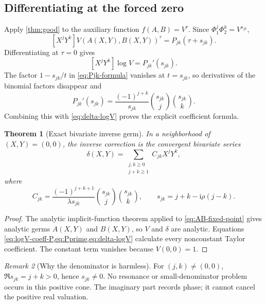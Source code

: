 \documentclass[11pt,oneside]{article}
\numberwithin{equation}{section}
\theoremstyle{plain}
\newtheorem{theorem}{Theorem}[section]
\theoremstyle{definition}
\theoremstyle{remark}
\newtheorem{remark}[theorem]{Remark}
\newcommand{\ii}{\mathrm i}
\begin{document}
\subsection{Differentiating at the forced zero}

Apply \cref{thm:good} to the auxiliary function \(f(A,B)=V^\tau\).  Since
\(\Phi_1^j\Phi_2^k=V^{s_{jk}}\),
\begin{equation}\label{eq:Vtau-coeff}
 [X^jY^k]V(A(X,Y),B(X,Y))^\tau
 =P_{jk}(\tau+s_{jk}).
\end{equation}
Differentiating at \(\tau=0\) gives
\begin{equation}\label{eq:logV-coeff-P}
 [X^jY^k]\log V=P_{jk}'(s_{jk}).
\end{equation}
The factor \(1-s_{jk}/t\) in \cref{eq:Pjk-formula} vanishes at
\(t=s_{jk}\), so derivatives of the binomial factors disappear and
\begin{equation}\label{eq:Pprime}
 P_{jk}'(s_{jk})=
 \frac{(-1)^{j+k}}{s_{jk}}
 \binom{s_{jk}}j\binom{s_{jk}}k.
\end{equation}
Combining this with \cref{eq:delta-logV} proves the explicit coefficient
formula.

\begin{theorem}[Exact bivariate inverse germ]\label{thm:bivariate-inverse}
In a neighborhood of \((X,Y)=(0,0)\), the inverse correction is the
convergent bivariate series
\begin{equation}\label{eq:delta-XY}
 \delta(X,Y)=
 \sum_{\substack{j,k\ge0\\j+k\ge1}}
 C_{jk}X^jY^k,
\end{equation}
where
\begin{equation}\label{eq:Cjk}
 C_{jk}=\frac{(-1)^{j+k+1}}{\lambda s_{jk}}
 \binom{s_{jk}}j\binom{s_{jk}}k,
 \qquad
 s_{jk}=j+k-\ii\rho(j-k).
\end{equation}
\end{theorem}

\begin{proof}
The analytic implicit-function theorem applied to
\cref{eq:AB-fixed-point} gives analytic germs \(A(X,Y)\) and \(B(X,Y)\),
so \(V\) and \(\delta\) are analytic.  Equations
\cref{eq:logV-coeff-P,eq:Pprime,eq:delta-logV} calculate every nonconstant
Taylor coefficient.  The constant term vanishes because \(V(0,0)=1\).
\end{proof}

\begin{remark}[Why the denominator is harmless]
For \((j,k)\ne(0,0)\),
\(
 \Re s_{jk}=j+k>0
\), hence \(s_{jk}\ne0\).  No resonance or small-denominator problem occurs
in this positive cone.  The imaginary part records phase; it cannot cancel
the positive real valuation.
\end{remark}
\end{document}
